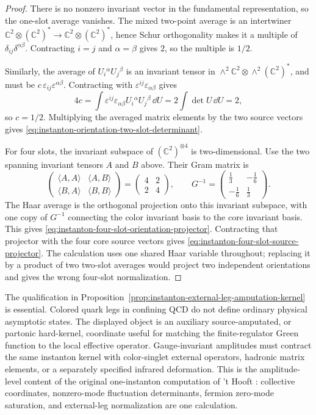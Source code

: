 \begin{proof}
There is no nonzero invariant vector in the fundamental representation, so
the one-slot average vanishes.  The mixed two-point average is an intertwiner
\(\mathbb C^2\otimes(\mathbb C^2)^*\to
\mathbb C^2\otimes(\mathbb C^2)^*\), hence Schur orthogonality makes it a
multiple of \(\delta_{ij}\delta^{\alpha\beta}\).  Contracting \(i=j\) and
\(\alpha=\beta\) gives \(2\), so the multiple is \(1/2\).

Similarly, the average of \(U_i{}^\alpha U_j{}^\beta\) is an invariant tensor
in \(\wedge^2\mathbb C^2\otimes\wedge^2(\mathbb C^2)^*\), and must be
\(c\,\varepsilon_{ij}\varepsilon^{\alpha\beta}\).  Contracting with
\(\varepsilon^{ij}\varepsilon_{\alpha\beta}\) gives
\[
  4c
  =
  \int
  \varepsilon^{ij}\varepsilon_{\alpha\beta}
  U_i{}^\alpha U_j{}^\beta\,\dd U
  =
  2\int\det U\,\dd U
  =
  2,
\]
so \(c=1/2\).  Multiplying the averaged matrix elements by the two source
vectors gives
\eqref{eq:instanton-orientation-two-slot-determinant}.

For four slots, the invariant subspace of
\((\mathbb C^2)^{\otimes4}\) is two-dimensional.  Use the two spanning
invariant tensors \(A\) and \(B\) above.  Their Gram matrix is
\[
  \begin{pmatrix}
  \langle A,A\rangle & \langle A,B\rangle\\
  \langle B,A\rangle & \langle B,B\rangle
  \end{pmatrix}
  =
  \begin{pmatrix}4&2\\2&4\end{pmatrix},
  \qquad
  G^{-1}
  =
  \begin{pmatrix}\frac13&-\frac16\\[2pt]-\frac16&\frac13\end{pmatrix}.
\]
The Haar average is the orthogonal projection onto this invariant subspace,
with one copy of \(G^{-1}\) connecting the color invariant basis to the core
invariant basis.  This gives
\eqref{eq:instanton-four-slot-orientation-projector}.  Contracting that
projector with the four core source vectors gives
\eqref{eq:instanton-four-slot-source-projector}.  The calculation uses one
shared Haar variable throughout; replacing it by a product of two two-slot
averages would project two independent orientations and gives the wrong
four-slot normalization.
\end{proof}

The qualification in
Proposition~\ref{prop:instanton-external-leg-amputation-kernel} is essential.
Colored quark legs in confining QCD do not define ordinary physical
asymptotic states.  The displayed object is an auxiliary source-amputated, or
partonic hard-kernel, coordinate useful for matching the finite-regulator
Green function to the local effective operator.  Gauge-invariant amplitudes
must contract the same instanton kernel with color-singlet external
operators, hadronic matrix elements, or a separately specified infrared
deformation.  This is the amplitude-level content of the original
one-instanton computation of 't Hooft
\cite{tHooft1976Pseudoparticle}: collective coordinates, nonzero-mode
fluctuation determinants, fermion zero-mode saturation, and external-leg
normalization are one calculation.

